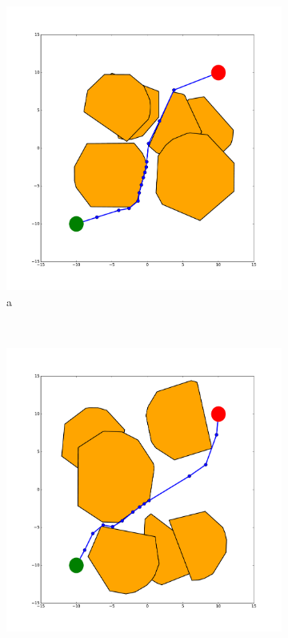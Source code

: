 \documentclass[12pt]{article}
\begin{document}
\begin{figure}[t!]
    \centering
    \begin{subfigure}[t]{0.32\textwidth}
        \centering
        \includegraphics[width=\textwidth]{2d_example_1.pdf}
        \caption{a}
    \end{subfigure}%
    ~ 
    \begin{subfigure}[t]{0.32\textwidth}
        \centering
        \includegraphics[width=\textwidth]{2d_example_2.pdf}

\end{subfigure}
\end{figure}
\end{document}
